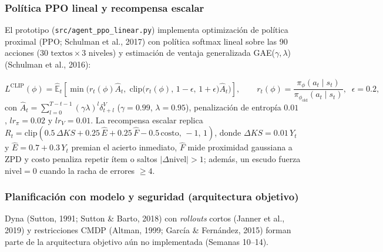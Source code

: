 \documentclass[10.5pt,a4paper]{article}
\newcommand{\code}[1]{\texttt{\color{InkDark}#1}}
\begin{document}
\subsubsection*{Política PPO lineal y recompensa escalar}
El prototipo (\code{src/agent\_ppo\_linear.py}) implementa optimización de política proximal (PPO; Schulman et al., 2017) con política softmax lineal sobre las 90 acciones ($30\text{ textos} \times 3\text{ niveles}$) y estimación de ventaja generalizada GAE($\gamma,\lambda$) (Schulman et al., 2016):
\begin{mathbox}[ElectricBlue]
\begin{equation}
  L^{\mathrm{CLIP}}(\phi) = \hat{\mathbb{E}}_t\!\left[\min\!\Big(r_t(\phi)\hat{A}_t,\; \mathrm{clip}\big(r_t(\phi),\, 1-\epsilon,\, 1+\epsilon\big)\hat{A}_t\Big)\right], \qquad r_t(\phi) = \frac{\pi_\phi(a_t \mid s_t)}{\pi_{\phi_{\text{old}}}(a_t \mid s_t)},\;\; \epsilon = 0.2,
  \label{eq:ppo}
\end{equation}
con $\hat{A}_t = \sum_{l=0}^{T-t-1} (\gamma\lambda)^l \delta_{t+l}^V$ ($\gamma=0.99$, $\lambda=0.95$), penalización de entropía $0.01$, $lr_\pi = 0.02$ y $lr_V = 0.01$. La recompensa escalar replica $R_t = \mathrm{clip}(0.5\,\Delta KS + 0.25\,\hat{E} + 0.25\,\hat{F} - 0.5\,\mathrm{costo},\,-1,\,1)$, donde $\Delta KS = 0.01\,Y_t$ y $\hat{E} = 0.7 + 0.3\,Y_t$ premian el acierto inmediato, $\hat{F}$ mide proximidad gaussiana a ZPD y $\mathrm{costo}$ penaliza repetir ítem o saltos $|\Delta\text{nivel}|>1$; además, un escudo fuerza $\text{nivel}=0$ cuando la racha de errores $\ge 4$.
\end{mathbox}

\subsubsection*{Planificación con modelo y seguridad (arquitectura objetivo)}
Dyna (Sutton, 1991; Sutton \& Barto, 2018) con \textit{rollouts} cortos (Janner et al., 2019) y restricciones CMDP (Altman, 1999; García \& Fernández, 2015) forman parte de la arquitectura objetivo aún no implementada (Semanas 10--14).
\end{document}
